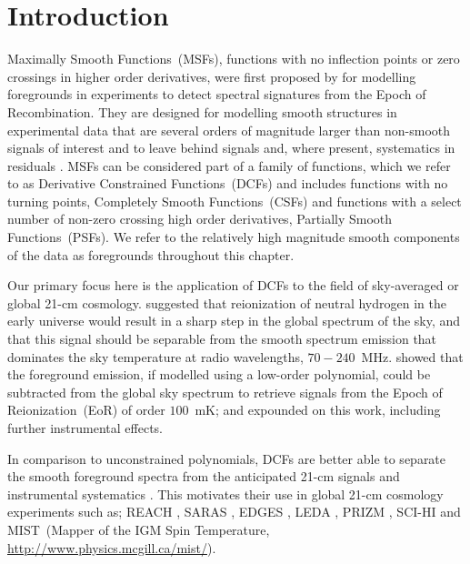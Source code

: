 \section{Introduction}
\label{sec:intro}

Maximally Smooth Functions~(MSFs), functions with no inflection points or zero crossings in higher order derivatives, were first proposed by \cite{Sathyanarayana2015} for modelling foregrounds in experiments to detect spectral signatures from the Epoch of Recombination. They are designed for modelling smooth structures in experimental data that are several orders of magnitude larger than non-smooth signals of interest and to leave behind signals and, where present, systematics in residuals \citep[see also,][]{Sathyanarayana_msf_2017}. MSFs can be considered part of a family of functions, which we refer to as Derivative Constrained Functions~(DCFs) and includes functions with no turning points, Completely Smooth Functions~(CSFs) and functions with a select number of non-zero crossing high order derivatives, Partially Smooth Functions~(PSFs). We refer to the relatively high magnitude smooth components of the data as foregrounds throughout this chapter.

Our primary focus here is the application of DCFs to the field of sky-averaged or global 21-cm cosmology. \cite{Shaver1999} suggested that reionization of neutral hydrogen in the early universe would result in a sharp step in the global spectrum of the sky, and that this signal should be separable from the smooth spectrum emission that dominates the sky temperature at radio wavelengths, $70 - 240$~MHz. \cite{Pritchard2010} showed that the foreground emission, if modelled using a low-order polynomial, could be subtracted from the global sky spectrum to retrieve signals from the Epoch of Reionization~(EoR) of order $100$~mK; \cite{Harker2012} and \cite{Bernardi2015} expounded on this work, including further instrumental effects.

In comparison to unconstrained polynomials, DCFs are better able to separate the smooth foreground spectra from the anticipated 21-cm signals and instrumental systematics \citep{Sathyanarayana_msf_2017}. This motivates their use in global 21-cm cosmology experiments such as; REACH \cite{Acedo_REACH_2019}, SARAS \citep{SARAS2_radiometer_2018}, EDGES \citep{Bowman_edges_2018}, LEDA \citep{Price_LEDA_2018}, PRIZM \citep{Philip_PRIZM_2019}, SCI-HI \citep[Sonda Cosmol\'ogica de las Islas para la Detecci\'on de Hidr\'ogeno Neutro,][]{SCIHI} and MIST~(Mapper of the IGM Spin Temperature, \url{http://www.physics.mcgill.ca/mist/}).

